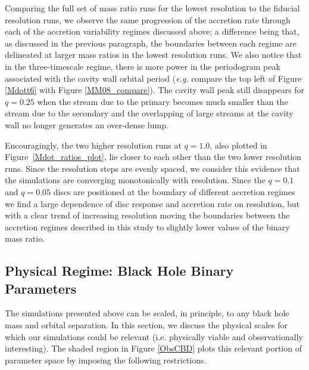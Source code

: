 Comparing the full set of mass ratio runs for the lowest resolution to the fiducial resolution runs, we observe the same progression of the accretion rate through each of the accretion variability regimes discussed above; a difference being that, as discussed in the previous paragraph, the boundaries between each regime are delineated at larger mass ratios in the lowest resolution runs. We also notice that in the three-timescale regime, there is more power in the periodogram peak associated with the cavity wall orbital period (\textit{e.g.} compare the top left of Figure \ref{Mdott6} with Figure \ref{MM08_compare}). The cavity wall peak still disappears for $q=0.25$ when the stream due to the primary becomes much smaller than the stream due to the secondary and the overlapping of large streams at the cavity wall no longer generates an over-dense lump.



Encouragingly, the two higher resolution runs at $q=1.0$,
also plotted in Figure~\ref{Mdot_ratios_plot}, lie closer to each
other than the two lower resolution runs. Since the resolution steps
are evenly spaced, we consider this evidence that the simulations are
converging monotonically with resolution. Since the $q=0.1$ and 
$q=0.05$ discs are positioned at the boundary of different accretion 
regimes we find a large dependence of disc response and accretion rate on resolution, but with a clear 
trend of increasing resolution moving the boundaries between the 
accretion regimes described in this study to slightly lower values of the binary mass ratio. 




\subsection{Physical Regime: Black Hole Binary Parameters}
\label{Physical Regime}

The simulations presented above can be scaled, in principle, to any black hole mass
and orbital separation.  In this section, we discuss the physical
scales for which our simulations could be relevant (i.e. physically
viable and observationally interesting). The shaded region in 
Figure \ref{ObsCBD} plots this relevant portion of parameter 
space by imposing the following restrictions.

